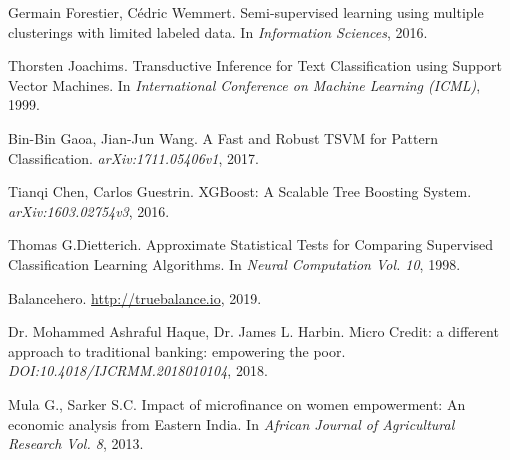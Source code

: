 \documentclass{article}
\begin{document}
\begin{thebibliography}{99}
Germain Forestier, Cédric Wemmert. 
Semi-supervised learning using multiple clusterings with limited labeled data. 
In {\em Information Sciences}, 2016.


Thorsten Joachims.
Transductive Inference for Text Classification using Support Vector Machines.
In {\em International Conference on Machine Learning (ICML)}, 1999.

Bin-Bin Gaoa, Jian-Jun Wang.
A Fast and Robust TSVM for Pattern Classification.
{\em arXiv:1711.05406v1}, 2017.

Tianqi Chen, Carlos Guestrin.
XGBoost: A Scalable Tree Boosting System.
{\em arXiv:1603.02754v3}, 2016.


Thomas G.Dietterich.
Approximate Statistical Tests for Comparing Supervised Classification Learning Algorithms.
In {\em Neural Computation Vol. 10}, 1998.


Balancehero.
\url{http://truebalance.io}, 2019.

Dr. Mohammed Ashraful Haque, Dr. James L. Harbin.
Micro Credit: a different approach to traditional banking: empowering the poor.
{\em DOI:10.4018/IJCRMM.2018010104}, 2018.

Mula G., Sarker S.C.
Impact of microfinance on women empowerment: An economic analysis from Eastern India.
In {\em African Journal of Agricultural Research Vol. 8}, 2013.

\end{thebibliography}
\end{document}
